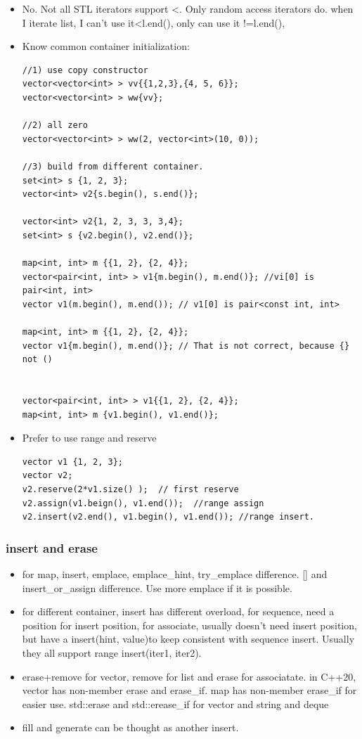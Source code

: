\documentclass[a4paper,11pt,twoside]{book}
\begin{document}
\begin{itemize}

	\item No. Not all STL iterators support <. Only random access iterators do. when I iterate list, I can't use it<l.end(), only can use it !=l.end(),

	\item Know common container initialization:
\begin{lstlisting}
//1) use copy constructor
vector<vector<int> > vv{{1,2,3},{4, 5, 6}};
vector<vector<int> > ww{vv};

//2) all zero
vector<vector<int> > ww(2, vector<int>(10, 0));

//3) build from different container.
set<int> s {1, 2, 3};
vector<int> v2{s.begin(), s.end()};

vector<int> v2{1, 2, 3, 3, 3,4};
set<int> s {v2.begin(), v2.end()};

map<int, int> m {{1, 2}, {2, 4}};
vector<pair<int, int> > v1{m.begin(), m.end()}; //vi[0] is pair<int, int>
vector v1(m.begin(), m.end()); // v1[0] is pair<const int, int> 

map<int, int> m {{1, 2}, {2, 4}};
vector v1{m.begin(), m.end()}; // That is not correct, because {} not ()


vector<pair<int, int> > v1{{1, 2}, {2, 4}};
map<int, int> m {v1.begin(), v1.end()};	
\end{lstlisting}

	\item Prefer to use range and reserve
\begin{lstlisting}
vector v1 {1, 2, 3};
vector v2;
v2.reserve(2*v1.size() );  // first reserve
v2.assign(v1.beign(), v1.end());  //range assign
v2.insert(v2.end(), v1.begin(), v1.end()); //range insert.	
\end{lstlisting}

\end{itemize}

\subsubsection{insert and erase}
\begin{itemize}
	\item for map, insert, emplace, emplace\_hint, try\_emplace difference. [] and insert\_or\_assign difference. Use more emplace if it is possible. 

	\item for different container, insert has different overload, for sequence, need a position for insert position, for associate, usually doesn't need insert position, but have a insert(hint, value)to keep consistent with sequence insert. Usually they all support range insert(iter1, iter2).

	\item erase+remove for vector, remove for list and erase for associatate. in C++20, vector has non-member erase and erase\_if. map has non-member erase\_if for easier use. std::erase and std::erease\_if for vector and string and deque

	\item fill and generate can be thought as another insert. 
\end{itemize}
\end{document}

